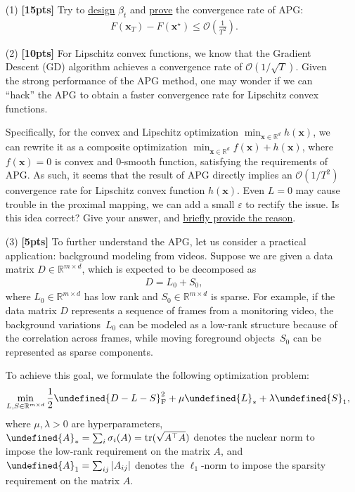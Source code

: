 \documentclass[a4paper]{article}
\numberwithin{equation}{section}
\theoremstyle{definition}
\theoremstyle{definition}
\def \O {\mathcal{O}}
\def \R {\mathbb{R}}
\def \x {\textbf{x}}
\let\norm\undefined
\let\epsilon\varepsilon
\DeclarePairedDelimiter\norm{\lVert}{\rVert}
\begin{document}
\begin{enumerate}
  \item[(1)] \textbf{[15pts]} Try to \underline{design} $\beta_t$ and \underline{prove} the convergence rate of APG:
  \begin{align*}
    F(\x_T) - F(\x^\star) \le \O\left(\frac{1}{T^2}\right). 
  \end{align*}
  \item[(2)] \textbf{[10pts]} For Lipschitz convex functions, we know that the Gradient Descent (GD) algorithm achieves a convergence rate of $\O(1/\sqrt{T})$. Given the strong performance of the APG method, one may wonder if we can ``hack'' the APG to obtain a faster convergence rate for Lipschitz convex functions. 
  
  Specifically, for the convex and Lipschitz optimization  $\min_{\x \in \R^d} h(\x)$, we can rewrite it as a composite optimization $\min_{\x \in \R^d} f(\x) + h(\x)$, where $f(\x) = 0$ is convex and $0$-smooth function, satisfying the requirements of APG. As such, it seems that the result of APG directly implies an $\O(1/T^2)$ convergence rate for Lipschitz convex function $h(\x)$. Even $L=0$ may cause trouble in the proximal mapping, we can add a small $\epsilon$ to rectify the issue. Is this idea correct? Give your answer, and \underline{briefly provide the reason}. 
  \item[(3)] \textbf{[5pts]} To further understand the APG, let us consider a practical application: background modeling from videos. Suppose we are given a data matrix $D\in\mathbb{R}^{m\times d}$, which is expected to be decomposed as
  \begin{align*}
    D = L_0 + S_0,
  \end{align*}
  where $L_0 \in \R^{m\times d}$ has low rank and $S_0 \in \R^{m \times d}$ is sparse. For example, if the data matrix $D$ represents a sequence of frames from a monitoring video, the background variations~$L_0$ can be modeled as a low-rank structure because of the correlation across frames, while moving foreground objects~$S_0$ can be represented as sparse components.
  
  To achieve this goal, we formulate the following optimization problem:
  \begin{align}
    \label{eq:objective}
    \min_{L, S\in\mathbb{R}^{m\times d}} \frac{1}{2}\norm{D - L - S}_\text{F}^2 + \mu \norm{L}_* + \lambda \norm{S}_1,
  \end{align}
  where $\mu,\lambda>0$ are hyperparameters, $\norm{A}_*=\sum_{i}\sigma_i(A)=\text{tr}(\sqrt{A^\top A})$ denotes the nuclear norm to impose the low-rank requirement on the matrix $A$, and $\norm{A}_1=\sum_{ij}|A_{ij}|$ denotes the $\ell_1$-norm to impose the sparsity requirement on the matrix $A$.
  

\end{enumerate}
\end{document}
